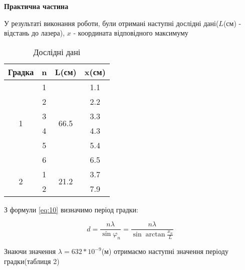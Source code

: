 \begin{center}
    \Large{\textbf{Практична частина}}
\end{center}

\vspace{1mm}

У результаті виконання роботи, були отримані наступні дослідні дані($L$(см) - відстань до лазера),
$x$ - координата відповідного максимуму

\begin{table}[h!]
    \centering
    \begin{tabular}{|c|c|c|c|}
        \hline
        \textbf{Градка} & \textbf{n} & \textbf{L(см)} & \textbf{x(см)} \\        
        \hline
        \multirow{6}{*}{1} & 1 & \multirow{6}{*}{66.5} & 1.1 \\
        \cline{2-2} \cline{4-4}
         & 2 &  & 2.2 \\
        \cline{2-2} \cline{4-4}
         & 3 &  & 3.3 \\
        \cline{2-2} \cline{4-4}
        & 4 &  & 4.3 \\
        \cline{2-2} \cline{4-4}
        & 5 &  & 5.4 \\
        \cline{2-2} \cline{4-4}
        & 6 &  & 6.5 \\
        \hline

        
        \multirow{2}{*}{2} & 1 & \multirow{2}{*}{21.2} & 3.7 \\        
        \cline{2-2} \cline{4-4}
        & 2 &  & 7.9 \\
        \hline
    \end{tabular}

    \caption{Дослідні дані}
\end{table}

З формули \ref{eq:10} визначимо період градки:

$$ d = \frac{n \lambda}{\sin{\varphi_n}} = \frac{n \lambda}{\sin{\arctan{\frac{x_n}{L}}}} $$

Знаючи значення $\lambda = 632*10^{-9}$(м) отримаємо наступні значення \; періоду 
градки(таблиця 2)

